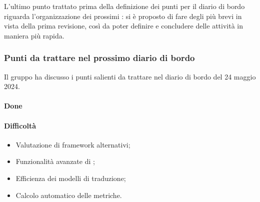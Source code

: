\par L'ultimo punto trattato prima della definizione dei punti per il diario di bordo riguarda l'organizzazione dei prossimi : si è proposto di fare degli  più brevi in vista della prima revisione, così da poter definire e concludere delle attività in maniera più rapida.

\subsubsection{Punti da trattare nel prossimo diario di bordo}
\par Il gruppo ha discusso i punti salienti da trattare nel diario di bordo del 24 maggio 2024.
\paragraph{Done}
\paragraph{Difficoltà}
\begin{itemize}
	\item Valutazione di framework alternativi;
	\item Funzionalità avanzate di ;
	\item Efficienza dei modelli di traduzione;
	\item Calcolo automatico delle metriche.
\end{itemize}	
